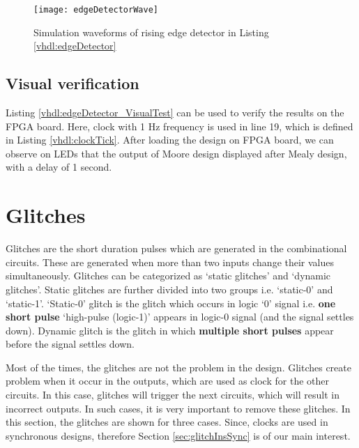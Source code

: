 \begin{figure}[!h]
	\centering
	\texttt{[image: edgeDetectorWave]}
	\caption{Simulation waveforms of rising edge detector in Listing \ref{vhdl:edgeDetector}}
	\label{fig:edgeDetectorWave}
\end{figure}

\subsection{Visual verification}
Listing \ref{vhdl:edgeDetector_VisualTest} can be used to verify the results on the FPGA board. Here, clock with 1 Hz frequency is used in line 19, which is defined in Listing \ref{vhdl:clockTick}. After loading the design on FPGA board, we can observe on LEDs that the output of Moore design displayed after  Mealy design, with a delay of 1 second.  




\section{Glitches} \label{sec:glitches}
Glitches are the short duration pulses which are generated in the combinational circuits. These are generated when more than two inputs change their values simultaneously. Glitches can be categorized as `static glitches' and `dynamic glitches'. Static glitches are further divided into two groups i.e. `static-0' and `static-1'. `Static-0' glitch is the glitch which occurs in logic `0' signal i.e. \textbf{one short pulse} `high-pulse (logic-1)' appears in logic-0 signal (and the signal settles down). Dynamic glitch is the glitch in which \textbf{multiple short pulses} appear before the signal settles down. 

\begin{noNumBox}
 Most of the times, the glitches are not the problem in the design. Glitches create problem when it occur in the outputs, which are used as clock for the other circuits. In this case, glitches will trigger the next circuits, which will result in incorrect outputs. In such cases, it is very important to remove these glitches. In this section, the glitches are shown for three cases. Since, clocks are used in synchronous designs, therefore Section \ref{sec:glitchInsSync} is of our main interest.
 \end{noNumBox} 
  

